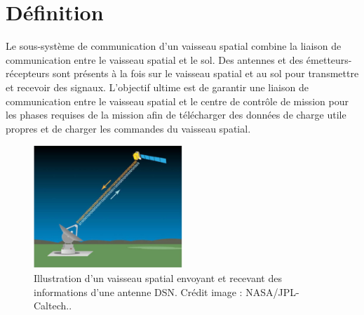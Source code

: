 \section{Définition} %
Le sous-système de communication d'un vaisseau spatial combine la liaison de communication entre le vaisseau spatial et le sol. Des antennes et des émetteurs-récepteurs sont présents à la fois sur le vaisseau spatial et au sol pour transmettre et recevoir des signaux. L'objectif ultime est de garantir une liaison de communication entre le vaisseau spatial et le centre de contrôle de mission pour les phases requises de la mission afin de télécharger des données de charge utile propres et de charger les commandes du vaisseau spatial.

\begin{figure}[H] %
    \centering
    \includegraphics[width=0.5\textwidth]{figures/6-1.eps}
    
    \caption{Illustration d'un vaisseau spatial envoyant et recevant des informations d'une antenne DSN. Crédit image : NASA/JPL-Caltech..}
    \label{fig:communication}
\end{figure}
